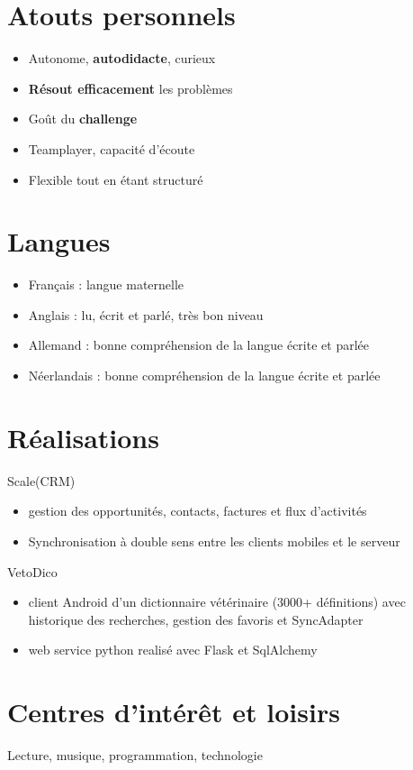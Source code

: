 \documentclass[11pt, a4paper]{moderncv}
\begin{document}
\section{Atouts personnels}
	\begin{itemize}
		\item Autonome, \textbf{autodidacte}, curieux
		\item \textbf{Résout efficacement} les problèmes
		\item Goût du \textbf{challenge}
		\item Teamplayer, capacité d’écoute
		\item Flexible tout en étant structuré
	\end{itemize}


		
\section{Langues}
	\begin{itemize}
		\item Français : langue maternelle
		\item Anglais : lu, écrit et parlé, très bon niveau 
		\item Allemand : bonne compréhension de la langue écrite et parlée
		\item Néerlandais : bonne compréhension de la langue écrite et parlée 
	\end{itemize}

\section{Réalisations}
	\cvitem
		{Scale(CRM)}
		{
			\begin{itemize}
				\item gestion des opportunités, contacts, factures et flux d’activités
				\item Synchronisation à double sens entre les clients mobiles et le serveur
			\end{itemize} 
		}
	\cvitem
		{VetoDico}
		{
			\begin{itemize}
				\item client Android d’un dictionnaire vétérinaire (3000+ définitions) avec historique des recherches, gestion des favoris et SyncAdapter
 				\item web service python realisé avec Flask et SqlAlchemy
			\end{itemize}
			}

\section{Centres d’intérêt et loisirs}
		Lecture, musique, programmation, technologie
\end{document}
